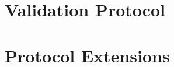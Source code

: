 \section{Validation Protocol}
\label{sec:vd-protocol}


\section{Protocol Extensions}
\label{sec:protocol-extensions}





